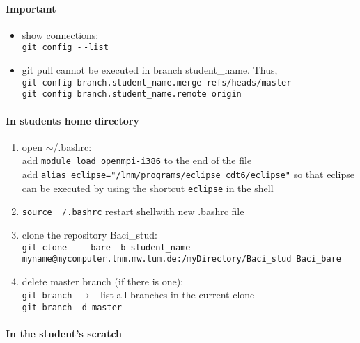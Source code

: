 \paragraph{Important}

\begin{itemize}
  \item show connections: \\
 \texttt{git config -$\,$-list }
  \item git pull cannot be executed in branch student\_name. Thus, \\
  \texttt{git config branch.student\_name.merge refs/heads/master} \\
  \texttt{git config  branch.student\_name.remote origin} 
\end{itemize}


\paragraph{In students home directory}

\begin{enumerate}
  \item open $\sim$/.bashrc: \\
  add \texttt{module load openmpi-i386} to the end of the file \\
  add \texttt{alias eclipse="/lnm/programs/eclipse\_cdt6/eclipse"} so that  eclipse can be executed by using the shortcut \texttt{eclipse} in the shell
  \item \texttt{source ~/.bashrc} restart shellwith new .bashrc file
  \item clone the repository Baci\_stud: \\
  \texttt{git clone $ ~$ -$\,$-bare -b student\_name myname@mycomputer.lnm.mw.tum.de:/myDirectory/Baci\_stud Baci\_bare}
  \item delete master branch (if there is one): \\
  \texttt{git branch $\rightarrow $ } list all branches in the current clone \\
  \texttt{git branch -d master} \\
\end{enumerate}

\paragraph{In the student's scratch}

